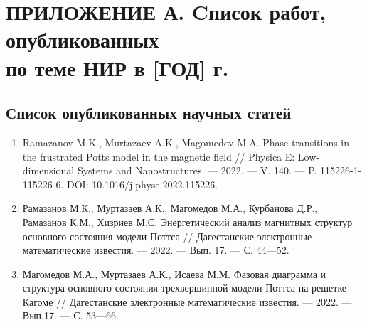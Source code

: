 \chapter{ПРИЛОЖЕНИЕ А. Cписок работ, опубликованных \texorpdfstring{\\ }{} по теме НИР в [ГОД] г.}


\section*{Список опубликованных научных статей}

\begin{enumerate}[1]




    
    \item
    Ramazanov M.K., Murtazaev A.K., Magomedov M.A.
    Phase transitions in the frustrated Potts model in the magnetic field
    //
    Physica E: Low-dimensional Systems and Nanostructures.
    --- 2022.
    --- V. 140.
    --- P. 115226-1-115226-6. DOI: 10.1016/j.physe.2022.115226.
    
    \item
    Рамазанов М.К., Муртазаев А.К., Магомедов М.А., Курбанова Д.Р., Рамазанов К.М., Хизриев М.С.
    Энергетический анализ магнитных структур основного состояния модели Поттса
    //
    Дагестанские электронные математические известия.
    --- 2022.
    --- Вып. 17.
    --- С. 44---52.
    
    \item
    Магомедов М.А., Муртазаев А.К., Исаева М.М.
    Фазовая диаграмма и структура основного состояния трехвершинной модели Поттса на решетке Кагоме
    //
    Дагестанские электронные математические известия.
    --- 2022.
    --- Вып.17.
    --- С. 53---66.
    

\end{enumerate}
